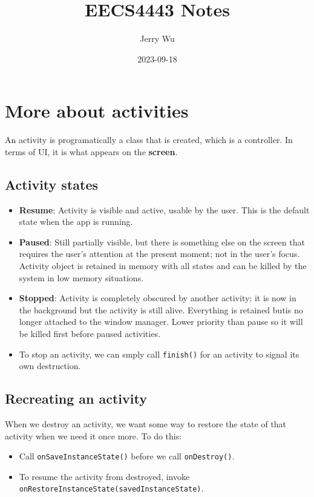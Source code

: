 \documentclass[12pt]{book}
\title{EECS4443 Notes}
\author{Jerry Wu}
\date{2023-09-18}
\begin{document}
\maketitle

\section*{More about activities}

An activity is programatically a class that is created, which is a controller. In terms of UI, it is what appears on the \textbf{screen}.

\subsection*{Activity states}

\begin{itemize}
  \item \textbf{Resume}: Activity is visible and active, usable by the user. This is the default state when the app is running.
  \item \textbf{Paused}: Still partially visible, but there is something else on the screen that requires the user's attention at the present moment; not in the user's focus. Activity object is retained in memory with all states and can be killed by the system in low memory situations.
  \item \textbf{Stopped}: Activity is completely obscured by another activity; it is now in the background but the activity is still alive. Everything is retained butis no longer attached to the window manager. Lower priority than pause so it will be killed first before paused activities.
  \item To stop an activity, we can smply call \texttt{finish()} for an activity to signal its own destruction.
\end{itemize}

\subsection*{Recreating an activity}

When we destroy an activity, we want some way to restore the state of that activity when we need it once more. To do this:
  \begin{itemize}
  \item Call \texttt{onSaveInstanceState()} before we call \texttt{onDestroy()}. 
  \item To resume the activity from destroyed, invoke\\ \texttt{onRestoreInstanceState(savedInstanceState)}.
  \end{itemize}
\end{document}
